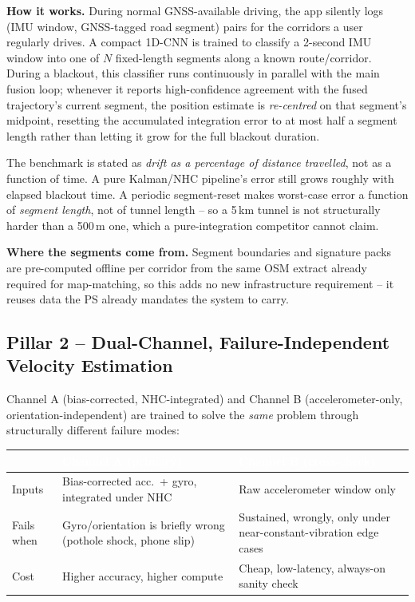 \documentclass[10.5pt]{article}
\begin{document}
\textbf{How it works.} During normal GNSS-available driving, the app silently logs (IMU window, GNSS-tagged road segment) pairs for the corridors a user regularly drives. A compact 1D-CNN is trained to classify a 2-second IMU window into one of $N$ fixed-length segments along a known route/corridor. During a blackout, this classifier runs continuously in parallel with the main fusion loop; whenever it reports high-confidence agreement with the fused trajectory's current segment, the position estimate is \emph{re-centred} on that segment's midpoint, resetting the accumulated integration error to at most half a segment length rather than letting it grow for the full blackout duration.

\begin{keyinsight}
The benchmark is stated as \emph{drift as a percentage of distance travelled}, not as a function of time. A pure Kalman/NHC pipeline's error still grows roughly with elapsed blackout time. A periodic segment-reset makes worst-case error a function of \emph{segment length}, not of tunnel length -- so a 5\,km tunnel is not structurally harder than a 500\,m one, which a pure-integration competitor cannot claim.
\end{keyinsight}

\textbf{Where the segments come from.} Segment boundaries and signature packs are pre-computed offline per corridor from the same OSM extract already required for map-matching, so this adds no new infrastructure requirement -- it reuses data the PS already mandates the system to carry.

\subsection{Pillar 2 -- Dual-Channel, Failure-Independent Velocity Estimation}
Channel A (bias-corrected, NHC-integrated) and Channel B (accelerometer-only, orientation-independent) are trained to solve the \emph{same} problem through structurally different failure modes:

\begin{center}
\begin{tabular}{@{}p{4.6cm}p{5.6cm}p{4.6cm}@{}}
\toprule
\rowcolor{tablehead}
\textcolor{white}{\textbf{}} & \textcolor{white}{\textbf{Channel A (primary)}} & \textcolor{white}{\textbf{Channel B (cross-check)}} \\
\midrule
Inputs & Bias-corrected acc.\ + gyro, integrated under NHC & Raw accelerometer window only \\
Fails when & Gyro/orientation is briefly wrong (pothole shock, phone slip) & Sustained, wrongly, only under near-constant-vibration edge cases \\
Cost & Higher accuracy, higher compute & Cheap, low-latency, always-on sanity check \\
\bottomrule
\end{tabular}
\end{center}
\end{document}

